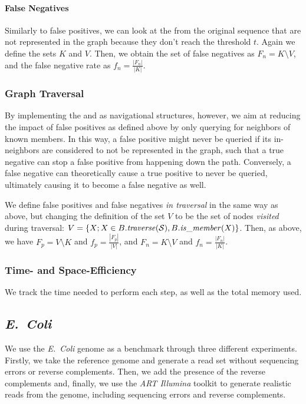 \paragraph{False Negatives} Similarly to false positives, we can look at the  from the original sequence that are not represented in the graph because they don't reach the threshold $t$. Again we define the sets $K$ and $V$. Then, we obtain the set of false negatives as $F_n = K \setminus V$, and the false negative rate as $f_n = \frac{|F_n|}{|K|}$.

\subsubsection{Graph Traversal}

By implementing the \dBCM and \dBHT as navigational structures, however, we aim at reducing the impact of false positives as defined above by only querying for neighbors of known members. In this way, a false positive \kmer might never be queried if its in-neighbors are considered to not be represented in the graph, such that a true negative can stop a false positive from happening down the path. Conversely, a false negative can theoretically cause a true positive to never be queried, ultimately causing it to become a false negative as well.


We define false positives and false negatives \emph{in traversal} in the same way as above, but changing the definition of the set $V$ to be the set of nodes \emph{visited} during traversal: $V = \{X ; X \in B.\mathit{traverse}(\strsetname{S}), B.\mathit{is\_member}(X)\}$. Then, as above, we have $F_p = V \setminus K$ and $f_p = \frac{|F_p|}{|V|}$, and $F_n = K \setminus V$ and $f_n = \frac{|F_n|}{|K|}$.

\subsubsection{Time- and Space-Efficiency}

We track the time needed to perform each step, as well as the total memory used.

\subsection{\emph{E.~Coli}}

We use the \emph{E.~Coli} genome \cite{ecoligenome}  as a benchmark through three different experiments. Firstly, we take the reference genome and generate a read set \readset without sequencing errors or reverse complements. Then, we add the presence of the reverse complements and, finally, we use the \emph{ART Illumina} toolkit \cite{Huang2011} to generate realistic reads from the genome, including sequencing errors and reverse complements.

